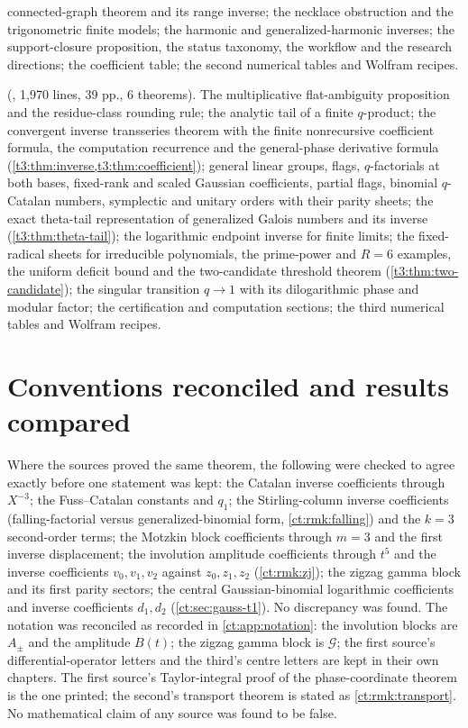 \documentclass[11pt,openany]{book}
\numberwithin{equation}{chapter}
\theoremstyle{plain}
\theoremstyle{definition}
\theoremstyle{remark}
\begin{document}
\begin{description}[leftmargin=1.5em,style=nextline]
connected-graph theorem and its range inverse; the necklace obstruction and
the trigonometric finite models; the harmonic and generalized-harmonic
inverses; the support-closure proposition, the status taxonomy, the
workflow and the research directions; the coefficient table; the second
numerical tables and Wolfram recipes.
\item[Source 3 (labels \texttt{t3:}): \emph{Combinatorial Transseries and
Their Inverses: $q$-Products, Finite Fields, Theta Sectors, and Arithmetic
Sheets}] (, 1{,}970 lines,
39 pp., 6 theorems).  The multiplicative flat-ambiguity proposition and the
residue-class rounding rule; the analytic tail of a finite $q$-product; the
convergent inverse transseries theorem with the finite nonrecursive
coefficient formula, the computation recurrence and the general-phase
derivative formula (\cref{t3:thm:inverse,t3:thm:coefficient}); general
linear groups, flags, $q$-factorials at both bases, fixed-rank and scaled
Gaussian coefficients, partial flags, binomial $q$-Catalan numbers,
symplectic and unitary orders with their parity sheets; the exact theta-tail
representation of generalized Galois numbers and its inverse
(\cref{t3:thm:theta-tail}); the logarithmic endpoint inverse for finite
limits; the fixed-radical sheets for irreducible polynomials, the
prime-power and $R=6$ examples, the uniform deficit bound and the
two-candidate threshold theorem (\cref{t3:thm:two-candidate}); the singular
transition $q\to1$ with its dilogarithmic phase and modular factor; the
certification and computation sections; the third numerical tables and
Wolfram recipes.
\end{description}

\section{Conventions reconciled and results compared}

Where the sources proved the same theorem, the following were checked to
agree exactly before one statement was kept: the Catalan inverse
coefficients through $X^{-3}$; the Fuss--Catalan constants and $q_1$; the
Stirling-column inverse coefficients (falling-factorial versus
generalized-binomial form, \cref{ct:rmk:falling}) and the $k=3$ second-order
terms; the Motzkin block coefficients through $m=3$ and the first inverse
displacement; the involution amplitude coefficients through $t^5$ and the
inverse coefficients $v_0,v_1,v_2$ against $z_0,z_1,z_2$
(\cref{ct:rmk:zj}); the zigzag gamma block and its first parity sectors;
the central Gaussian-binomial logarithmic coefficients and inverse
coefficients $d_1,d_2$ (\cref{ct:sec:gauss-t1}).  No discrepancy was found.
The notation was reconciled as recorded in \cref{ct:app:notation}: the
involution blocks are $A_\pm$ and the amplitude $B(t)$; the zigzag gamma
block is $\mathcal G$; the first source's differential-operator letters and
the third's centre letters are kept in their own chapters.  The first
source's Taylor-integral proof of the phase-coordinate theorem is the one
printed; the second's transport theorem is stated as
\cref{ct:rmk:transport}.  No mathematical claim of any source was found to
be false.
\end{document}
